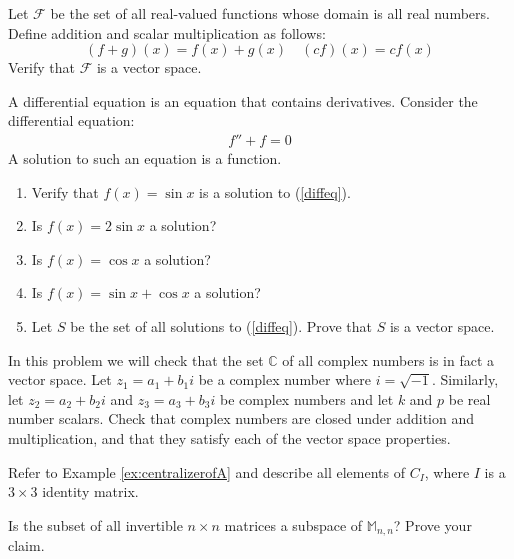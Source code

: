 \documentclass{ximera}
\begin{document}
 \begin{problem}\label{prob:abstractvectspace5}
 Let $\mathcal{F}$ be the set of all real-valued functions whose domain is all real numbers.  Define addition and scalar multiplication as follows:
 $$(f+g)(x)=f(x)+g(x)\quad (cf)(x)=cf(x)$$
 Verify that $\mathcal{F}$ is a vector space.
 \end{problem}
 \begin{problem}\label{prob:abstractvectspacediffeq}
 A differential equation is an equation that contains derivatives.  Consider the differential equation:
 \begin{align}\label{diffeq} f''+f=0\end{align}
A solution to such an equation is a function.
  \begin{enumerate}
  \item Verify that $f(x)=\sin x$ is a solution to (\ref{diffeq}).
  \item Is $f(x)=2\sin x$ a solution?
  \item Is $f(x)=\cos x$ a solution?
  \item Is $f(x)=\sin x+\cos x$ a solution?
  \item Let $S$ be the set of all solutions to (\ref{diffeq}).  Prove that $S$ is a vector space.
  \end{enumerate}
  \end{problem}
\begin{problem}\label{prob:abstractvectspacecomplex}
In this problem we will check that the set $\mathbb{C}$ of all complex numbers is in fact a vector space.  Let $z_1 = a_1 + b_1 i$ be a complex number where $i=\sqrt{-1}$.  Similarly, let $z_2 = a_2 + b_2 i$ and $z_3 = a_3 + b_3 i$ be complex numbers and let $k$ and $p$ be real number scalars.  Check that complex numbers are closed under addition and multiplication, and that they satisfy each of the vector space properties.
\end{problem}

\begin{problem}\label{prob:abstractvectspace6}
Refer to Example \ref{ex:centralizerofA} and describe all elements of $C_I$, where $I$ is a $3\times 3$ identity matrix.
\end{problem}
  
\begin{problem}\label{prob:abstractvectspace7}
Is the subset of all invertible $n\times n$ matrices a subspace of $\mathbb{M}_{n,n}$?  Prove your claim. 
\end{problem}
\end{document}
